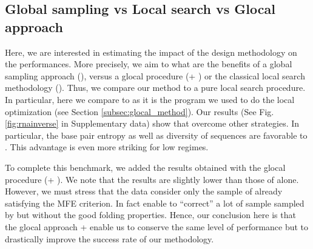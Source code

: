 \subsection{Global sampling vs Local search vs Glocal approach}
Here, we are interested in estimating the impact of the design methodology on the performances. More precisely, we aim to what are the benefits of a global sampling approach (\ourprog), versus a glocal procedure (\ourprog + \RNAinverse) or the classical local search methodology (\RNAinverse). Thus, we compare our method to a pure local search procedure. In particular, here we compare to \RNAinverse as it is the program we used to do the local optimization (see Section \ref{subsec:glocal_method}). Our results (See Fig. \ref{fig:rnainverse} in Supplementary data) show that \ourprog overcome other strategies. In particular, the base pair entropy as well as diversity of sequences are favorable to \ourprog. This advantage is even more striking for low \GCContent regimes.

To complete this benchmark, we added the results obtained with the glocal procedure (\ourprog + \RNAinverse). We note that the results are slightly lower than those of \ourprog alone. However, we must stress that the \ourprog data consider only the sample of \ourprog already satisfying the MFE criterion. In fact \RNAinverse enable to ``correct'' a lot of sample sampled by \ourprog but without the good folding properties. Hence, our conclusion here is that the glocal approach \ourprog + \RNAinverse enable us to conserve the same level of performance but to drastically improve the success rate of our methodology. 






\label{fig:rnainverse}

